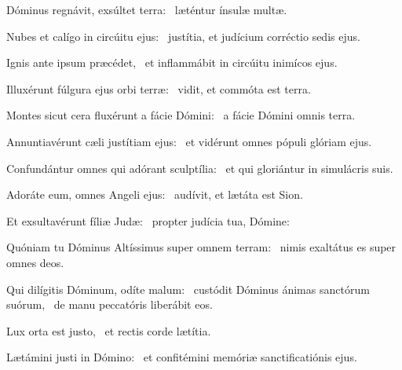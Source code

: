 \item Dóminus regnávit, exsúltet terra:~\psstar{} læténtur ínsulæ multæ.

\item Nubes et calígo in circúitu ejus:~\psstar{} justítia, et judícium corréctio sedis ejus.

\item Ignis ante ipsum præcédet,~\psstar{} et inflammábit in circúitu inimícos ejus.

\item Illuxérunt fúlgura ejus orbi terræ:~\psstar{} vidit, et commóta est terra.

\item Montes sicut cera fluxérunt a fácie Dómini:~\psstar{} a fácie Dómini omnis terra.

\item Annuntiavérunt cæli justítiam ejus:~\psstar{} et vidérunt omnes pópuli glóriam ejus.

\item Confundántur omnes qui adórant sculptília:~\psstar{} et qui gloriántur in simulácris suis.

\item Adoráte eum, omnes Angeli ejus:~\psstar{} audívit, et lætáta est Sion.

\item Et exsultavérunt fíliæ Judæ:~\psstar{} propter judícia tua, Dómine:

\item Quóniam tu Dóminus Altíssimus super omnem terram:~\psstar{} nimis exaltátus es super omnes deos.

\item Qui dilígitis Dóminum, odíte malum:~\pscross{} custódit Dóminus ánimas sanctórum suórum,~\psstar{} de manu peccatóris liberábit eos.

\item Lux orta est justo,~\psstar{} et rectis corde lætítia.

\item Lætámini justi in Dómino:~\psstar{} et confitémini memóriæ sanctificatiónis ejus.
